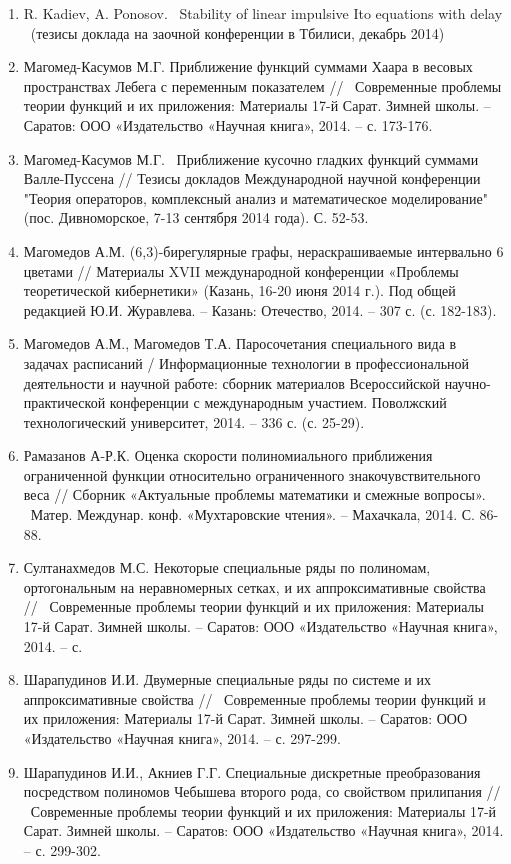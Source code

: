 \begin{enumerate}
\item  R. Kadiev, A. Ponosov. ~Stability of linear impulsive Ito equations with delay ~(тезисы доклада на заочной конференции в Тбилиси, декабрь 2014)

\item  Магомед-Касумов М.Г. Приближение функций суммами Хаара в весовых пространствах Лебега с переменным показателем // ~Современные проблемы теории функций и их приложения: Материалы 17-й Сарат. Зимней школы. -- Саратов: ООО «Издательство «Научная книга», 2014. -- с. 173-176.

\item  Магомед-Касумов М.Г. ~Приближение кусочно гладких функций суммами Валле-Пуссена // Тезисы докладов Международной научной конференции "Теория операторов, комплексный анализ и математическое моделирование" (пос. Дивноморское, 7-13 сентября 2014 года). С. 52-53.

\item  Магомедов А.М. (6,3)-бирегулярные графы, нераскрашиваемые интервально 6 цветами // Материалы XVII международной конференции «Проблемы теоретической кибернетики» (Казань, 16-20 июня 2014 г.). Под общей редакцией Ю.И. Журавлева. -- Казань: Отечество, 2014. -- 307 с. (с. 182-183).

\item  Магомедов А.М., Магомедов Т.А. Паросочетания специального вида в задачах расписаний / Информационные технологии в профессиональной деятельности и научной работе: сборник материалов Всероссийской научно-практической конференции с международным участием. Поволжский технологический университет, 2014. -- 336 с. (с. 25-29).

\item  Рамазанов А-Р.К. Оценка скорости полиномиального приближения ограниченной функции относительно ограниченного знакочувствительного веса // Сборник «Актуальные проблемы математики и смежные вопросы». ~Матер. Междунар. конф. «Мухтаровские чтения». -- Махачкала, 2014. С. 86-88.

\item  Султанахмедов М.С. Некоторые специальные ряды по полиномам, ортогональным на неравномерных сетках, и их аппроксимативные свойства // ~Современные проблемы теории функций и их приложения: Материалы 17-й Сарат. Зимней школы. -- Саратов: ООО «Издательство «Научная книга», 2014. -- с.

\item  Шарапудинов И.И. Двумерные специальные ряды по системе  и их аппроксимативные свойства // ~Современные проблемы теории функций и их приложения: Материалы 17-й Сарат. Зимней школы. -- Саратов: ООО «Издательство «Научная книга», 2014. -- с. 297-299.

\item  Шарапудинов И.И., Акниев Г.Г. Специальные дискретные преобразования посредством полиномов Чебышева второго рода, со свойством прилипания // ~Современные проблемы теории функций и их приложения: Материалы 17-й Сарат. Зимней школы. -- Саратов: ООО «Издательство «Научная книга», 2014. -- с. 299-302.
\end{enumerate}

